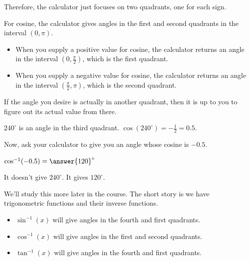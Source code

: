\documentclass{ximera}
\begin{document}
Therefore, the calculator just focuses on two quadrants, one for each sign. 


For cosine, the calculator gives angles in the first and second quadrants in the interval $(0, \pi)$. 

\begin{itemize}
\item When you supply a positive value for cosine, the calculator returns an angle in the interval $\left( 0, \frac{\pi}{2} \right)$, which is the first quadrant.
\item When you supply a negative value for cosine, the calculator returns an angle in the interval $\left( \frac{\pi}{2}, \pi \right)$, which is the second quadrant.
\end{itemize}


If the angle you desire is actually in another quadrant, then it is up to you to figure out its actual value from there.







\begin{question} 

$240^{\circ}$ is an angle in the third quadrant. $\cos(240^{\circ}) = -\frac{1}{2} = 0.5$.


Now, ask your calculator to give you an angle whose cosine is $-0.5$.


$\cos^{-1}(-0.5) = \answer{120}^{\circ}$


It doesn't give $240^{\circ}$.  It gives $120^{\circ}$.

\end{question}














We'll study this more later in the course.  The short story is we have trigonometric functions and their inverse functions.




\begin{itemize}
\item $\sin^{-1}(x)$ will give angles in the fourth and first quadrants.
\item $\cos^{-1}(x)$ will give angles in the first and second quadrants.
\item $\tan^{-1}(x)$ will give angles in the fourth and first quadrants.
\end{itemize}
\end{document}
